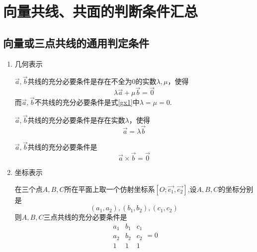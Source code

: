 \section{向量共线、共面的判断条件汇总}
\subsection{向量或三点共线的通用判定条件}
\begin{enumerate}[1.]
	\setlength{\itemindent}{0em}
	\setlength{\topsep}{0.01em}
	\setlength{\itemsep}{0.01em}
	\item {\color{dy2}几何表示}
	
	\enbelowtheorem[共线定理1]
	\quad $\overrightarrow{a},\overrightarrow{b}$共线的充分必要条件是存在不全为$0$的实数$\lambda,\mu $，使得
	\begin{equation}
		\lambda \overrightarrow{a}+\mu \overrightarrow{b}=\overrightarrow{0}
		\label{gx1}
	\end{equation}
	{\color{dy} 而$\overrightarrow{a},\overrightarrow{b}$不共线的充分必要条件是式\eqref{gx1}中$\lambda=\mu=0 $.}
	
	\addentheorem[共线定理2]
	\quad $\overrightarrow{a},\overrightarrow{b}$共线的充分必要条件是存在实数$\lambda $，使得
	\begin{equation}
		\overrightarrow{a}=\lambda \overrightarrow{b}
		\label{gx2}
	\end{equation}
	
	\addentheorem[共线定理3]
	\quad $\overrightarrow{a},\overrightarrow{b}$共线的充分必要条件是
	\begin{equation}
		\overrightarrow{a}\times\overrightarrow{b}=\overrightarrow{0}
	\end{equation}
	
	\item {\color{dy2}坐标表示}
	
	\enbelowtheorem[共线定理4]
	\quad 在三个点$A,B,C$所在平面上取一个仿射坐标系$[O;\overrightarrow{e_1},\overrightarrow{e_2}]$,设$A,B,C$的坐标分别是
	$$(a_1,a_2),(b_1,b_2),(c_1,c_2)$$
	则$A,B,C$三点共线的充分必要条件是
	\begin{equation}
		\begin{array}{|ccc|}
			a_1 & b_1 & c_1 \\
			a_2 & b_2 & c_2 \\
			1 & 1 & 1
		\end{array}=0
	\end{equation}
	

\end{enumerate}
